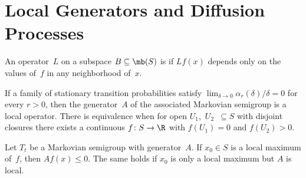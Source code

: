 \section	{Local Generators and Diffusion Processes}

\begin	{definition}
An operator~$L$ on a subspace \( B \subseteq \mb(S) \) is 
if $Lf(x)$ depends only on the values of~$f$ in any neighborhood of~$x$.
\end	{definition}

\begin	{proposition}
If a family of stationary transition probabilities
satisfy \( \lim_{\delta\to0} \alpha_r(\delta)/\delta = 0 \)
for every \( r > 0 \),
then the generator~$A$ of the associated Markovian semigroup
is a local operator.
There is equivalence when for open $U_1$,~$U_2$~$\subseteq S$
with disjoint closures
there exists a continuous \( f \colon S \to \R \)
with \( f(U_1) = 0 \) and \( f(U_2) > 0 \).
\end	{proposition}

\begin	{proposition}
Let $T_t$ be a Markovian semigroup with generator~$A$.
If \( x_0 \in S \) is a local maximum of~$f$,
then \( Af(x) \le 0 \).
The same holds if $x_0$ is only a local maximum but $A$ is local.
\end	{proposition}

